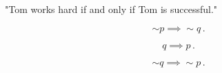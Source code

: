 %
%

\begin{subquestions}


\subquestion

"Tom works hard if and only if Tom is successful."

	
\subquestion 

\begin{subsubquestions}
	

\subsubquestion

\begin{equation}
	\sim p \implies \sim q\,.
\end{equation}


\subsubquestion

\begin{equation}
	q \implies p\,.
\end{equation}


\subsubquestion

\begin{equation}
	\sim q \implies \sim p\,.
\end{equation}

\end{subsubquestions}


\end{subquestions}
